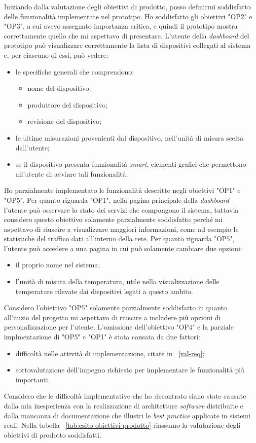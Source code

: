 Iniziando dalla valutazione degli obiettivi di prodotto, posso definirmi soddisfatto delle funzionalità implementate nel prototipo.
Ho soddisfatto gli obiettivi "OP2" e "OP3", a cui avevo assegnato importanza critica, e quindi il prototipo mostra correttamente quello che mi aspettavo di presentare.
L'utente della \emph{dashboard} del prototipo può visualizzare correttamente la lista di dispositivi collegati al sistema e, per ciascuno di essi, può vedere:
\begin{itemize}
  \item le specifiche generali che comprendono:
  \begin{itemize}
    \item nome del dispositivo;
    \item produttore del dispositivo;
    \item revisione del dispositivo;
  \end{itemize}
  \item le ultime misurazioni provenienti dal dispositivo, nell'unità di misura scelta dall'utente;
  \item se il dispositivo presenta funzionalità \emph{smart}, elementi grafici che permettono all'utente di avviare tali funzionalità.
\end{itemize}
Ho parzialmente implementato le funzionalità descritte negli obiettivi "OP1" e "OP5".
Per quanto riguarda "OP1", nella pagina principale della \emph{dashboard} l'utente può osservare lo stato dei servizi che compongono il sistema, tuttavia considero questo obiettivo solamente parzialmente soddisfatto perché mi aspettavo di riuscire a visualizzare maggiori informazioni, come ad esempio le statistiche del traffico dati all'interno della rete.
Per quanto riguarda "OP5", l'utente può accedere a una pagina in cui può solamente cambiare due opzioni:
\begin{itemize}
  \item il proprio nome nel sistema;
  \item l'unità di misura della temperatura, utile nella visualizzazione delle temperature rilevate dai dispositivi legati a questo ambito.
\end{itemize}
Considero l'obiettivo "OP5" solamente parzialmente soddisfatto in quanto all'inizio del progetto mi aspettavo di riuscire a includere più opzioni di personalizzazione per l'utente.
L'omissione dell'obiettivo "OP4" e la parziale implmentazione di "OP5" e "OP1" è stata causata da due fattori:
\begin{itemize}
  \item difficoltà nelle attività di implementazione, citate in ~\ref{val-req};
  \item sottovalutazione dell'impegno richiesto per implementare le funzionalità più importanti.
\end{itemize} 
Considero che le difficoltà implementative che ho riscontrato siano state causate dalla mia inesperienza con la realizzazione di architetture \emph{software} distribuite e dalla mancanza di documentazione che illustri le \emph{best practice} applicate in sistemi reali. 
Nella tabella ~\ref{tab:esito-obiettivi-prodotto} riassumo la valutazione degli obiettivi di prodotto soddisfatti.

